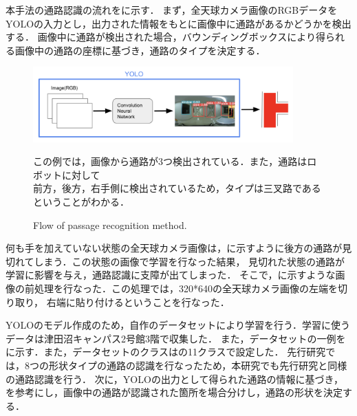 \documentclass[../main]{subfiles}
\begin{document}
        \newpage

        本手法の通路認識の流れをに示す．
        まず，全天球カメラ画像のRGBデータをYOLOの入力とし，出力された情報をもとに画像中に通路があるかどうかを検出する．
        画像中に通路が検出された場合，バウンディングボックスにより得られる画像中の通路の座標に基づき，通路のタイプを決定する．
        
        \begin{figure}[H]
            \centering
            \includegraphics[width=10cm]{../images/proposed_method2.png}
            \caption{Flow of passage recognition method.}
            \label{figure::proposed_method_fig}
            この例では，画像から通路が3つ検出されている．また，通路はロボットに対して\\
            前方，後方，右手側に検出されているため，タイプは三叉路であるということがわかる．
        \end{figure}

        \newpage
        
        何も手を加えていない状態の全天球カメラ画像は，に示すように後方の通路が見切れてしまう．この状態の画像で学習を行なった結果，
        見切れた状態の通路が学習に影響を与え，通路認識に支障が出てしまった．
        そこで，に示すような画像の前処理を行なった．この処理では，320*640の全天球カメラ画像の左端を切り取り，
        右端に貼り付けるということを行なった．

        YOLOのモデル作成のため，自作のデータセットにより学習を行う．学習に使うデータは津田沼キャンパス2号館3階で収集した．
        また，データセットの一例をに示す．また，データセットのクラスはの11クラスで設定した．
        先行研究では，8つの形状タイプの通路の認識を行なったため，本研究でも先行研究と同様の通路認識を行う．
        次に，YOLOの出力として得られた通路の情報に基づき，を参考にし，画像中の通路が認識された箇所を場合分けし，通路の形状を決定する．
        
\end{document}
